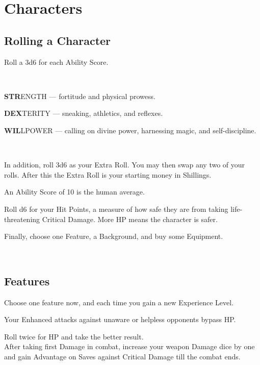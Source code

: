 \documentclass[itdr]{subfiles}
\begin{document}
\chapter{Characters}
\resetHeaders

\section{Rolling a Character}

Roll a 3d6 for each Ability Score.

~

\textbf{STR}ENGTH --- fortitude and physical prowess.

\textbf{DEX}TERITY --- sneaking, athletics, and reflexes.

\textbf{WIL}LPOWER --- calling on divine power, harnessing magic, and self-discipline.

~

In addition, roll 3d6 as your Extra Roll. You may then swap any two of your rolls. After this the Extra Roll is your starting money in Shillings.

An Ability Score of 10 is the human average.

Roll d6 for your Hit Points, a measure of how safe they are from taking life-threatening Critical Damage. More HP means the character is safer.

Finally, choose one Feature, a Background, and buy some Equipment.

~

\section{Features}

Choose one feature now, and each time you gain a new Experience Level.

Your Enhanced attacks against unaware or helpless opponents bypass HP.

 Roll twice for HP and take the better result.\\
After taking first Damage in combat, increase your weapon Damage dice by one and gain Advantage on Saves against Critical Damage till the combat ends.
\end{document}
